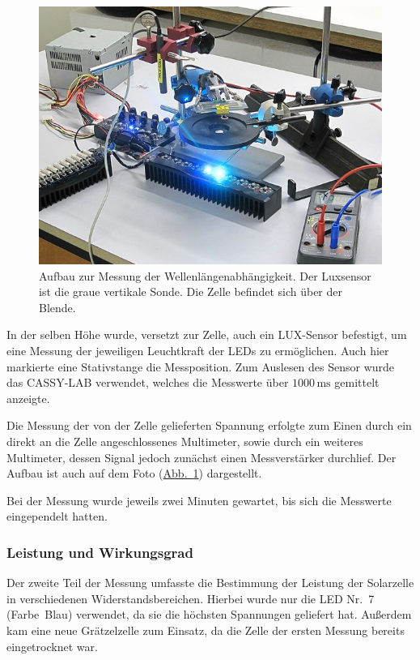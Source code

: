 \documentclass[11pt]{scrartcl}
\newcommand{\unit}[1]{\ensuremath{\,\mathrm{#1}}} %
\begin{document}
\begin{figure}[ht]
\begin{center}
\includegraphics[width=1.0\textwidth]{images/messung_farben.jpg}
\end{center}
\vspace{-1.5\baselineskip}
\caption{Aufbau zur Messung der Wellenlängenabhängigkeit. Der Luxsensor ist die graue vertikale Sonde. Die Zelle befindet sich über der Blende.}
\label{messung_farben}
\end{figure}

In der selben H\"ohe wurde, versetzt zur Zelle, auch ein LUX-Sensor befestigt, um eine Messung der jeweiligen Leuchtkraft der LEDs zu erm\"oglichen. Auch hier markierte eine Stativstange die Messposition. Zum Auslesen des Sensor wurde das CASSY-LAB verwendet, welches die Messwerte \"uber $1000\unit{ms}$ gemittelt anzeigte.

Die Messung der von der Zelle gelieferten Spannung erfolgte zum Einen durch ein direkt an die Zelle angeschlossenes Multimeter, sowie durch ein weiteres Multimeter, dessen Signal jedoch zun\"achst einen Messverst\"arker durchlief. Der Aufbau ist auch auf dem Foto (\hyperref[messung_farben]{Abb.~\ref{messung_farben}}) dargestellt.


Bei der Messung wurde jeweils zwei Minuten gewartet, bis sich die Messwerte eingependelt hatten.

\subsubsection{Leistung und Wirkungsgrad}
Der zweite Teil der Messung umfasste die Bestimmung der Leistung der Solarzelle in verschiedenen Widerstandsbereichen. Hierbei wurde nur die LED Nr.~7 (Farbe~Blau) verwendet, da sie die h\"ochsten Spannungen geliefert hat. Au\ss{}erdem kam eine neue Gr\"atzelzelle zum Einsatz, da die Zelle der ersten Messung bereits eingetrocknet war.
\end{document}
